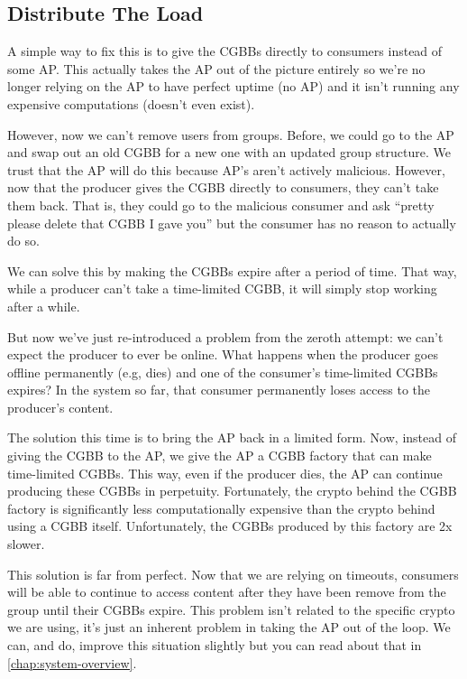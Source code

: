 \documentclass[pdftex,12pt,a4papaer,twoside,notitlepage]{report}
\begin{document}
\subsection{Distribute The Load}

A simple way to fix this is to give the CGBBs directly to consumers instead of
some AP. This actually takes the AP out of the picture entirely so we're no
longer relying on the AP to have perfect uptime (no AP) and it isn't running any
expensive computations (doesn't even exist).

However, now we can't remove users from groups. Before, we could go to the AP
and swap out an old CGBB for a new one with an updated group structure. We trust
that the AP will do this because AP's aren't actively malicious. However, now
that the producer gives the CGBB directly to consumers, they can't take them
back. That is, they could go to the malicious consumer and ask ``pretty please
delete that CGBB I gave you'' but the consumer has no reason to actually do so.

We can solve this by making the CGBBs expire after a period of time. That way,
while a producer can't take a time-limited CGBB, it will simply stop working
after a while.

But now we've just re-introduced a problem from the zeroth attempt: we can't
expect the producer to ever be online. What happens when the producer goes
offline permanently (e.g, dies) and one of the consumer's time-limited CGBBs
expires? In the system so far, that consumer permanently loses access to the
producer's content.

The solution this time is to bring the AP back in a limited form. Now, instead
of giving the CGBB to the AP, we give the AP a CGBB factory that can make
time-limited CGBBs. This way, even if the producer dies, the AP can continue
producing these CGBBs in perpetuity. Fortunately, the crypto behind the CGBB
factory is significantly less computationally expensive than the crypto behind
using a CGBB itself. Unfortunately, the CGBBs produced by this factory are 2x
slower.

This solution is far from perfect. Now that we are relying on timeouts,
consumers will be able to continue to access content after they have been remove
from the group until their CGBBs expire. This problem isn't related to the
specific crypto we are using, it's just an inherent problem in taking the AP out
of the loop. We can, and do, improve this situation slightly but you can read
about that in \cref{chap:system-overview}.
\end{document}

